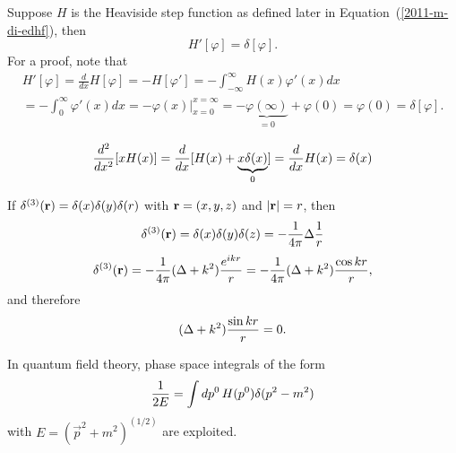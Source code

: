 Suppose $H$ is the
{Heaviside step function}
as defined later in Equation~(\ref{2011-m-di-edhf}), then
 \begin{equation}
H' [\varphi] =\delta[\varphi]
.
\label{2019-mm-ch-di-ad1}
\end{equation}
{\color{OliveGreen}
\bproof
For a proof, note that
 \begin{equation}
 \begin{split}
H'[\varphi] =\frac{d}{dx}H[\varphi ] = -H[\varphi']=
-\int_{-\infty}^\infty H (x)  \varphi'(x) dx
\\
=
-\int_{0}^\infty   \varphi'(x) dx
=
-\left. \varphi (x) \right|_{x=0}^{x=\infty} =   - \underbrace{\varphi (\infty )}_{=0} +\varphi (0)= \varphi (0) =\delta[\varphi ]
.
 \end{split}
\label{2019-mm-ch-di-ad2}
 \end{equation}
\eproof
}



 \begin{equation}
 {d^2\over dx^2}[x H (x)] = {d \over dx }[H(x) + \underbrace{x \delta  (x)}_{0}]={d \over dx } H(x)  = \delta (x)
 \end{equation}

If $ \delta^{(3)} ({\bf r})=
\delta (x)
\delta (y)
\delta (r)$ with ${\bf r}=(x,y,z)$ and $\vert {\bf r}\vert=r$, then
 \begin{equation}
 \delta^{(3)} ({\bf r})=\delta (x)\delta (y)\delta (z)=-{1\over 4\pi }\Delta {1\over  r }
 \end{equation}
 \begin{equation}
 \delta^{(3)}  ({\bf r})=-{1\over 4\pi }(\Delta +k^2){e^{ikr}\over r} = -{1\over 4\pi }(\Delta +k^2){\cos kr\over r},
 \end{equation}
and therefore
\begin{equation}
 (\Delta +k^2){\sin kr\over r} = 0.
 \end{equation}

In quantum field theory,  phase space integrals of the form
 \begin{equation}
 {1\over 2E}=\int dp^0 \, H (p^0)\delta (p^2-m^2)
 \end{equation}
 with $E=({\vec p}^2+m^2)^{(1/2)}$
 are exploited.

